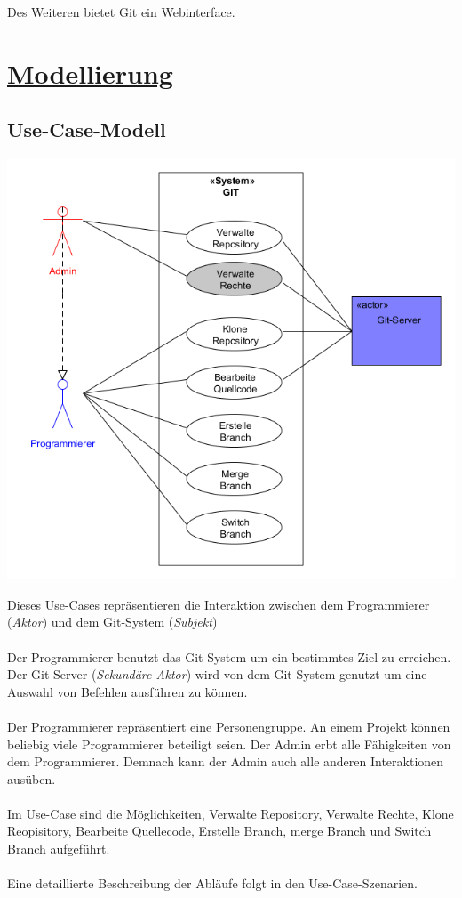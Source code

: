 \documentclass[a4paper]{article}
\begin{document}
Des Weiteren bietet Git ein Webinterface.

\section{\underline{Modellierung}}

\subsection{Use-Case-Modell}

\includegraphics[width=\textwidth]{Use-Case-Modell.png}	

Dieses Use-Cases repräsentieren die Interaktion zwischen dem Programmierer (\textit{Aktor}) und dem Git-System (\textit{Subjekt})\\  %
\\ %
Der Programmierer benutzt das Git-System um ein bestimmtes Ziel zu erreichen. 
Der Git-Server (\textit{Sekundäre Aktor}) wird von dem Git-System genutzt um eine Auswahl von Befehlen ausführen zu können.\\
\\
Der Programmierer repräsentiert eine Personengruppe. An einem Projekt können beliebig viele Programmierer beteiligt seien.  
Der Admin erbt alle Fähigkeiten von dem Programmierer. Demnach kann der Admin auch alle anderen Interaktionen ausüben.  \\
\\
Im Use-Case sind die Möglichkeiten, Verwalte \gls{Repository}, Verwalte Rechte, \gls{Klone} Reopisitory, Bearbeite Quellecode, Erstelle \gls{Branch}, \gls{merge} Branch und \gls{Switch} Branch aufgeführt. \\
\\
Eine detaillierte Beschreibung der Abläufe folgt in den Use-Case-Szenarien. 
\newpage	
\end{document}
